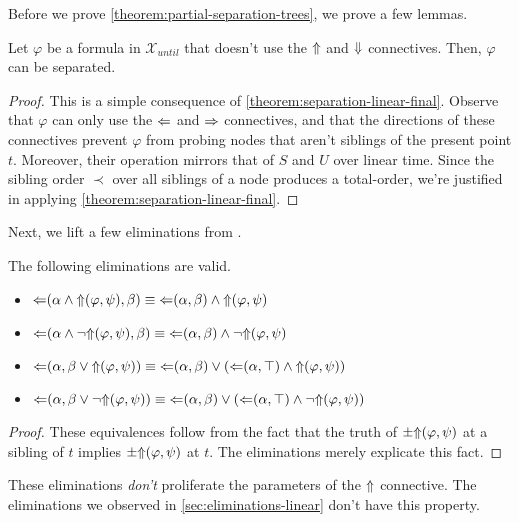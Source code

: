 \documentclass[a4paper,UKenglish,cleveref, autoref, thm-restate, numberwithinsect]{lipics-v2021}
\def\Larrow{\ensuremath\mathord{\Leftarrow}}
\def\Rarrow{\ensuremath\mathord{\Rightarrow}}
\def\Uarrow{\ensuremath\mathord{\Uparrow}}
\def\Darrow{\ensuremath\mathord{\Downarrow}}
\begin{document}
Before we prove \cref{theorem:partial-separation-trees}, we prove a few lemmas.
\begin{lemma}
    \label{lemma:partial-separation-trees-step1}
    Let $\varphi$ be a formula in $\mathcal{X}_{until}$ that doesn't use the $\Uarrow$ and $\Darrow$ connectives. Then, $\varphi$ can be separated.
\end{lemma}
\begin{proof}
    This is a simple consequence of \cref{theorem:separation-linear-final}. Observe that $\varphi$ can only use the $\Larrow$ and $\Rarrow$ connectives, and that the directions of these connectives prevent $\varphi$ from probing nodes that aren't siblings of the present point $t$. Moreover, their operation mirrors that of $S$ and $U$ over linear time. Since the sibling order $\prec$ over all siblings of a node produces a total-order, we're justified in applying \cref{theorem:separation-linear-final}.
\end{proof}
Next, we lift a few eliminations from \cite{xpathComplete}.
\begin{lemma}
    \label{lemma:partial-separation-trees-step2}
    The following eliminations are valid.
    \begin{itemize}
        \item $\Larrow(\alpha \land \mathord{\Uarrow}(\varphi, \psi), \beta) \equiv \Larrow(\alpha, \beta) \land \Uarrow(\varphi, \psi)$
        \item $\Larrow(\alpha \land \lnot \Uarrow (\varphi, \psi), \beta) \equiv \Larrow(\alpha, \beta) \land \lnot \Uarrow(\varphi, \psi)$
        \item $\Larrow(\alpha, \beta \lor \Uarrow(\varphi, \psi)) \equiv \Larrow(\alpha, \beta) \lor \left( \Larrow(\alpha, \top) \land \Uarrow(\varphi, \psi) \right)$
        \item $\Larrow(\alpha, \beta \lor \lnot \Uarrow(\varphi, \psi)) \equiv \Larrow(\alpha, \beta) \lor \left( \Larrow(\alpha, \top) \land \lnot \Uarrow(\varphi, \psi) \right)$
    \end{itemize}
\end{lemma}
\begin{proof}
    These equivalences follow from the fact that the truth of $\pm \Uarrow(\varphi, \psi)$ at a sibling of $t$ implies $\pm \Uarrow(\varphi,\psi)$ at $t$. The eliminations merely explicate this fact.
\end{proof}
\begin{note*}
    These eliminations \textit{don't} proliferate the parameters of the $\Uarrow$ connective. The eliminations we observed in \cref{sec:eliminations-linear} don't have this property.
\end{note*}
\end{document}
